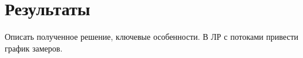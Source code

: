 \section{Результаты}

Описать полученное решение, ключевые особенности. В ЛР с потоками привести график замеров.

